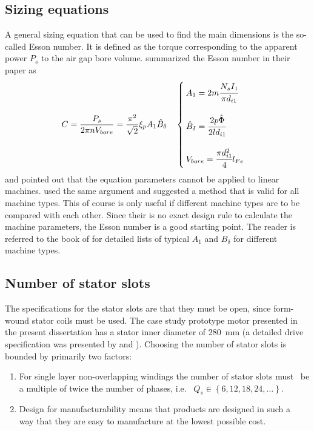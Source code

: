 \subsection{Sizing equations}
A general sizing equation that can be used to find the main dimensions is the so-called Esson number. It is defined as the torque corresponding to the apparent power $P_s$ to the air gap bore volume. \cite{Gutt1998} summarized the Esson number in their paper as
\begin{equation}
  \label{eqn:Esson}
  C = \frac{P_s}{2\pi n V_{bore}}=\frac{\pi^2}{\sqrt{2}}\xi_p A_1 \hat{B}_{\delta}
  \quad
  \begin{cases}
    A_1 = 2m\cfrac{N_s I_1}{\pi d_{i1}} \\
    \: \\
    \hat{B}_{\delta} = \cfrac{2p\hat{\Phi}}{2ld_{i1}}\\
    \: \\
    V_{bore}=\cfrac{\pi d_{i1}^{2}}{4}l_{Fe}
  \end{cases}  
\end{equation} 
and pointed out that the equation parameters cannot be applied to linear machines. \cite{Ronghai2004} used the same argument and suggested a method that is valid for all machine types. This of course is only useful if different machine types are to be compared with each other. Since their is no exact design rule to calculate the machine parameters, the Esson number is a good starting point. The reader is referred to the book of \cite{Vogt1996} for detailed lists of typical $A_1$ and $B_{\delta}$ for different machine types. 

\subsection{Number of stator slots}\label{subsec:number_of_slots}
The specifications for the stator slots are that they must be open, since form-wound stator coils must be used. The case study prototype motor presented in the present dissertation has a stator inner diameter of \SI{280}{mm} (a detailed drive specification was presented by \cite{germishuizen_2006} and \cite{joeckel_2006}). Choosing the number of stator slots is bounded by primarily two factors:
\begin{enumerate}
  \item For single layer non-overlapping windings the number of stator slots must~%
  be a multiple of twice the number of phases, i.e.~%
  $Q_{s} \in \left\{6,12,18,24,\ldots\right\}$.
  \item Design for manufacturability means that products are designed in such a~%
  way that they are easy to manufacture at the lowest possible cost.
\end{enumerate}


